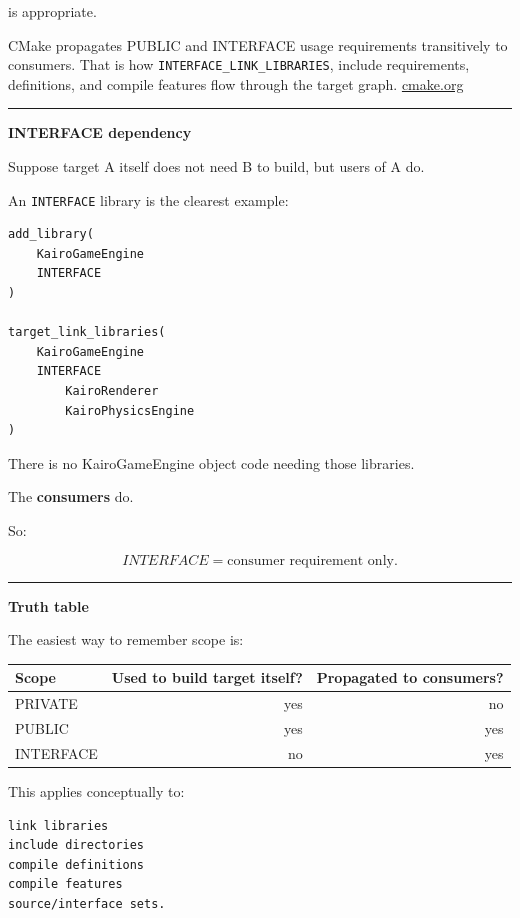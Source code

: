 is appropriate.

CMake propagates PUBLIC and INTERFACE usage requirements transitively to consumers. That is how \texttt{INTERFACE\_LINK\_LIBRARIES}, include requirements, definitions, and compile features flow through the target graph. \href{https://cmake.org/cmake/help/latest/prop_tgt/INTERFACE_LINK_LIBRARIES.html?utm_source=chatgpt.com}{cmake.org}

\begin{center}\rule{0.5\linewidth}{0.5pt}\end{center}

\textbf{INTERFACE dependency}

Suppose target A itself does not need B to build, but users of A do.

An \texttt{INTERFACE} library is the clearest example:

\begin{verbatim}
add_library(
    KairoGameEngine
    INTERFACE
)

target_link_libraries(
    KairoGameEngine
    INTERFACE
        KairoRenderer
        KairoPhysicsEngine
)
\end{verbatim}

There is no KairoGameEngine object code needing those libraries.

The \textbf{consumers} do.

So:

\[
INTERFACE
=
\text{consumer requirement only}.
\]

\begin{center}\rule{0.5\linewidth}{0.5pt}\end{center}

\textbf{Truth table}

The easiest way to remember scope is:

{\def\LTcaptype{none} %
\begin{longtable}[]{@{}lrr@{}}
\toprule\noalign{}
Scope & Used to build target itself? & Propagated to consumers? \\
\midrule\noalign{}
\endhead
\bottomrule\noalign{}
\endlastfoot
PRIVATE & yes & no \\
PUBLIC & yes & yes \\
INTERFACE & no & yes \\
\end{longtable}
}

This applies conceptually to:

\begin{verbatim}
link libraries
include directories
compile definitions
compile features
source/interface sets.
\end{verbatim}

